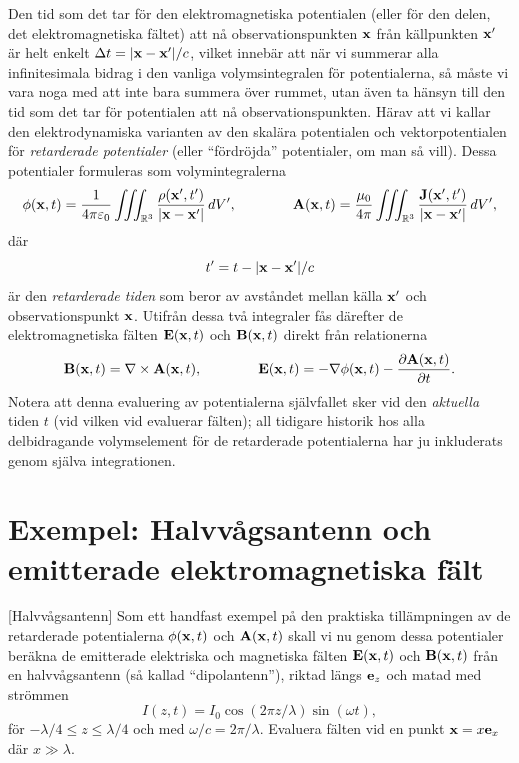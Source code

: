 {{{{{{\noindent
Den tid som det tar f{\"o}r den elektromagnetiska potentialen (eller f{\"o}r
den delen, det elektromagnetiska f{\"a}ltet) att n{\aa} observationspunkten
${\bf x}$ fr{\aa}n k{\"a}llpunkten ${\bf x}'$ {\"a}r helt enkelt
$\Delta t = |{\bf x}-{\bf x}'|/c$, vilket inneb{\"a}r att n{\"a}r vi summerar
alla infinitesimala bidrag i den vanliga volymsintegralen f{\"o}r potentialerna,
s{\aa} m{\aa}ste vi vara noga med att inte bara summera {\"o}ver rummet, utan
{\"a}ven ta h{\"a}nsyn till den tid som det tar f{\"o}r potentialen att n{\aa}
observationspunkten. H{\"a}rav att vi kallar den elektrodynamiska varianten av
den skal{\"a}ra potentialen och vektorpotentialen f{\"o}r {\it retarderade
potentialer} (eller ``f{\"o}rdr{\"o}jda'' potentialer, om man s{\aa} vill).
Dessa potentialer formuleras som volymintegralerna
$$
  \phi({\bf x},t)={{1}\over{4\pi\varepsilon_0}}\iiint_{{\Bbb R}^3}
    {{\rho({\bf x}',t')}\over{|{\bf x}-{\bf x}'|}}\,dV',\qquad\qquad
  {\bf A}({\bf x},t)={{\mu_0}\over{4\pi}}\iiint_{{\Bbb R}^3}
    {{{\bf J}({\bf x}',t')}\over{|{\bf x}-{\bf x}'|}}\,dV',
$$
d{\"a}r
$$
  t' = t - |{\bf x}-{\bf x}'|/c
$$
{\"a}r den {\it retarderade tiden} som beror av avst{\aa}ndet mellan k{\"a}lla
${\bf x}'$ och observationspunkt ${\bf x}$. Utifr{\aa}n dessa tv{\aa} integraler
f{\aa}s d{\"a}refter de elektromagnetiska f{\"a}lten ${\bf E}({\bf x},t)$ och
${\bf B}({\bf x},t)$ direkt fr{\aa}n relationerna
$$
  {\bf B}({\bf x},t)=\nabla\times{\bf A}({\bf x},t),\qquad\qquad
  {\bf E}({\bf x},t)
    =-\nabla\phi({\bf x},t)-{{\partial{\bf A}({\bf x},t)}\over{\partial t}}.
$$
Notera att denna evaluering av potentialerna sj{\"a}lvfallet sker vid den
{\it aktuella} tiden $t$ (vid vilken vid evaluerar f{\"a}lten); all tidigare
historik hos alla delbidragande volymselement f{\"o}r de retarderade
potentialerna har ju inkluderats genom sj{\"a}lva integrationen.
\vfill\eject

\section{Exempel: Halvv{\aa}gsantenn och emitterade elektromagnetiska f{\"a}lt}
[Halvv{\aa}gsantenn]
Som ett handfast exempel p{\aa} den praktiska till{\"a}mpningen av de
retarderade potentialerna $\phi({\bf x},t)$ och ${\bf A}({\bf x},t)$ skall vi
nu genom dessa potentialer ber{\"a}kna de emitterade elektriska och magnetiska
f{\"a}lten ${\bf E}({\bf x},t)$ och ${\bf B}({\bf x},t)$ fr{\aa}n en
halvv{\aa}gsantenn (s{\aa} kallad ``dipolantenn''), riktad l{\"a}ngs
${\bf e}_z$ och matad med str{\"o}mmen
$$
  I(z,t) = I_0\cos(2\pi z/\lambda)\sin(\omega t),
$$
f{\"o}r $-\lambda/4\le z\le \lambda/4$ och med $\omega/c=2\pi/\lambda$.
Evaluera f{\"a}lten vid en punkt ${\bf x}=x{\bf e}_x$ d{\"a}r $x\gg\lambda$.

}}}}}}
